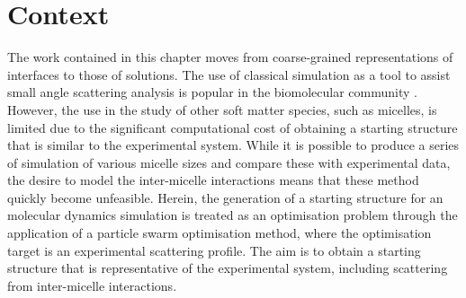 \section*{Context}
The work contained in this chapter moves from coarse-grained representations of interfaces to those of solutions.
The use of classical simulation as a tool to assist small angle scattering analysis is popular in the biomolecular community \cite{perkins_atomistic_2016,hub_interpreting_2018}.
However, the use in the study of other soft matter species, such as micelles, is limited due to the significant computational cost of obtaining a starting structure that is similar to the experimental system.
While it is possible to produce a series of simulation of various micelle sizes and compare these with experimental data, the desire to model the inter-micelle interactions means that these method quickly become unfeasible.
Herein, the generation of a starting structure for an molecular dynamics simulation is treated as an optimisation problem through the application of a particle swarm optimisation method, where the optimisation target is an experimental scattering profile.
The aim is to obtain a starting structure that is representative of the experimental system, including scattering from inter-micelle interactions. 
